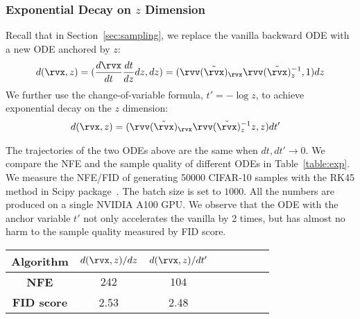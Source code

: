 \subsubsection{Exponential Decay on $z$ Dimension}
\label{app:exp}
Recall that in Section~\ref{sec:sampling}, we replace the vanilla backward ODE with a new ODE anchored by $z$:
\begin{align*}
    d(\rvx,z) = (\frac{d \rvx}{dt}\frac{d t}{dz}dz,dz) = (\rvv(\tilde{\rvx})_\rvx\rvv(\tilde{\rvx})_z^{-1}, 1) dz
\end{align*}
We further use the change-of-variable formula, \ie $t'=-\log z$, to achieve exponential decay on the $z$ dimension:
\begin{align*}
{d(\rvx,z)} &= (\rvv(\tilde{\rvx})_\rvx\rvv(\tilde{\rvx})_z^{-1}z, z){dt'} 
\end{align*}

The trajectories of the two ODEs above are the same when $dt, dt' \to 0$. We compare the NFE and the sample quality of different ODEs in Table~\ref{table:exp}. We measure the NFE/FID of generating 50000 CIFAR-10 samples with the RK45 method in Scipy package~\cite{Virtanen2020SciPy1F}. The batch size is set to $1000$. All the numbers are produced on a single NVIDIA A100 GPU. We observe that the ODE with the anchor variable $t'$ not only accelerates the vanilla by 2 times, but has almost no harm to the sample quality measured by FID score.
\begin{table*}[htb]
\begin{center}
\caption{NFE and FID scores of different backward ODEs in PFGM}
\label{table:exp}
\begin{tabular}{c c c c c c c c}
		\toprule
		\textbf{Algorithm} &  $d(\rvx,z)/dz$ &$d(\rvx,z)/dt'$\\
		\midrule
        \textbf{NFE} &  $242$ &$104$ \\
        \textbf{FID score} & 2.53 & 2.48 \\
        \bottomrule
\end{tabular}
\end{center}
\end{table*}

